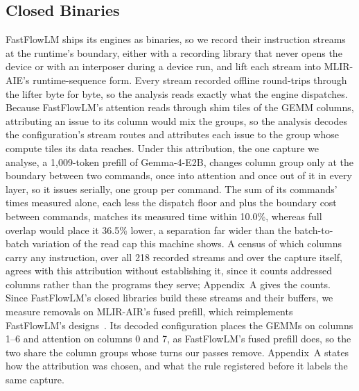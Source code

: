 \subsection{Closed Binaries}
\label{subsec:closed}

FastFlowLM ships its engines as binaries, so we record their instruction streams at the runtime's boundary, either with a recording library that never opens the device or with an interposer during a device run, and lift each stream into MLIR-AIE's runtime-sequence form.
Every stream recorded offline round-trips through the lifter byte for byte, so the analysis reads exactly what the engine dispatches.
Because FastFlowLM's attention reads through shim tiles of the GEMM columns, attributing an issue to its column would mix the groups, so the analysis decodes the configuration's stream routes and attributes each issue to the group whose compute tiles its data reaches.
Under this attribution, the one capture we analyse, a 1{,}009-token prefill of Gemma-4-E2B, changes column group only at the boundary between two commands, once into attention and once out of it in every layer, so it issues serially, one group per command.
The sum of its commands' times measured alone, each less the dispatch floor and plus the boundary cost between commands, matches its measured time within 10.0\%, whereas full overlap would place it 36.5\% lower, a separation far wider than the batch-to-batch variation of the read cap this machine shows.
A census of which columns carry any instruction, over all 218 recorded streams and over the capture itself, agrees with this attribution without establishing it, since it counts addressed columns rather than the programs they serve; Appendix~A gives the counts.
Since FastFlowLM's closed libraries build these streams and their buffers, we measure removals on MLIR-AIR's fused prefill, which reimplements FastFlowLM's designs~\citep{wang2026mlirair}.
Its decoded configuration places the GEMMs on columns 1--6 and attention on columns 0 and 7, as FastFlowLM's fused prefill does, so the two share the column groups whose turns our passes remove.
Appendix~A states how the attribution was chosen, and what the rule registered before it labels the same capture.
